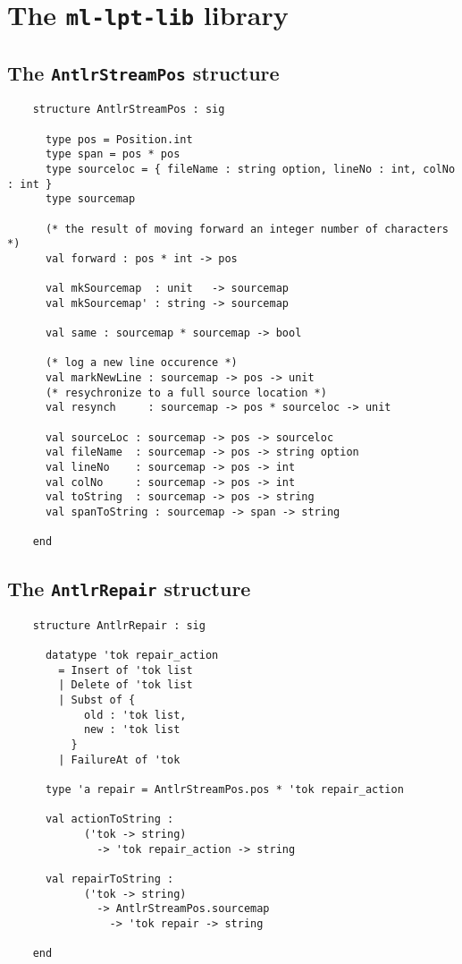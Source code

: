 %
\chapter{The {\tt ml-lpt-lib} library}
\label{ch:ml-lpt-lib}


\section{The {\tt AntlrStreamPos} structure}

\begin{verbatim}
    structure AntlrStreamPos : sig

      type pos = Position.int
      type span = pos * pos
      type sourceloc = { fileName : string option, lineNo : int, colNo : int }
      type sourcemap

      (* the result of moving forward an integer number of characters *)
      val forward : pos * int -> pos

      val mkSourcemap  : unit   -> sourcemap
      val mkSourcemap' : string -> sourcemap

      val same : sourcemap * sourcemap -> bool

      (* log a new line occurence *)
      val markNewLine : sourcemap -> pos -> unit
      (* resychronize to a full source location *)
      val resynch     : sourcemap -> pos * sourceloc -> unit

      val sourceLoc : sourcemap -> pos -> sourceloc
      val fileName  : sourcemap -> pos -> string option
      val lineNo    : sourcemap -> pos -> int
      val colNo     : sourcemap -> pos -> int
      val toString  : sourcemap -> pos -> string
      val spanToString : sourcemap -> span -> string

    end
\end{verbatim}


\section{The {\tt AntlrRepair} structure}

\begin{verbatim}
    structure AntlrRepair : sig

      datatype 'tok repair_action
        = Insert of 'tok list
        | Delete of 'tok list
        | Subst of {
            old : 'tok list,
            new : 'tok list
          }
        | FailureAt of 'tok
      
      type 'a repair = AntlrStreamPos.pos * 'tok repair_action
      
      val actionToString : 
            ('tok -> string)
              -> 'tok repair_action -> string
        
      val repairToString : 
            ('tok -> string)
              -> AntlrStreamPos.sourcemap
                -> 'tok repair -> string
        
    end
\end{verbatim}